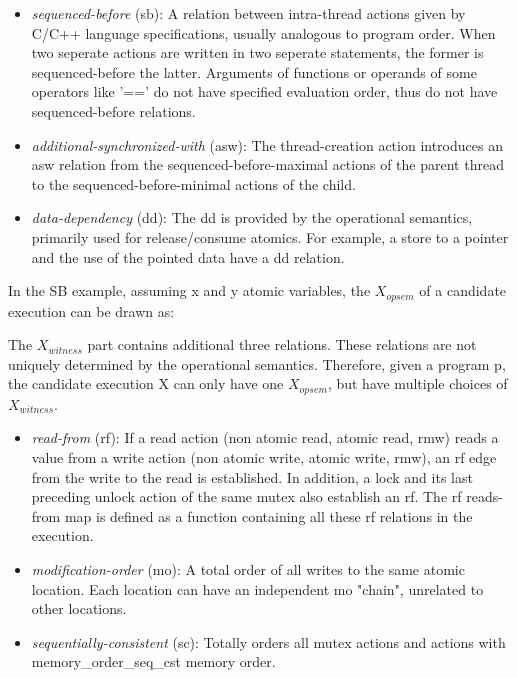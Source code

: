 \begin{itemize}
    \item \textit{sequenced-before} (sb): A relation between intra-thread actions given by C/C++ language specifications, usually analogous to program order. When two seperate actions are written in two seperate statements, the former is sequenced-before the latter. Arguments of functions or operands of some operators like '==' do not have specified evaluation order, thus do not have sequenced-before relations. 
    \item \textit{additional-synchronized-with} (asw): The thread-creation action introduces an asw relation from the sequenced-before-maximal actions of the parent thread to the sequenced-before-minimal actions of the child.
    \item \textit{data-dependency} (dd):  The dd is provided by the operational semantics, primarily used for release/consume atomics. For example, a store to a pointer and the use of the pointed data have a dd relation. 
\end{itemize}

In the SB example, assuming x and y atomic variables, the $X_{opsem}$ of a candidate execution can be drawn as: 

The $X_{witness}$ part contains additional three relations. These relations are not uniquely determined by the operational semantics. Therefore, given a program p, the candidate execution X can only have one $X_{opsem}$, but have multiple choices of $X_{witness}$. 

\begin{itemize}
    \item \textit{read-from} (rf): If a read action (non atomic read, atomic read, rmw) reads a value from a write action (non atomic write, atomic write, rmw), an rf edge from the write to the read is established. In addition, a lock and its last preceding unlock action of the same mutex also establish an rf. The rf reads-from map is defined as a function containing all these rf relations in the execution. 
    \item \textit{modification-order} (mo): A total order of all writes to the same atomic location. Each location can have an independent mo "chain", unrelated to other locations.
    \item \textit{sequentially-consistent} (sc): Totally orders all mutex actions and actions with memory\_order\_seq\_cst memory order.
\end{itemize}

